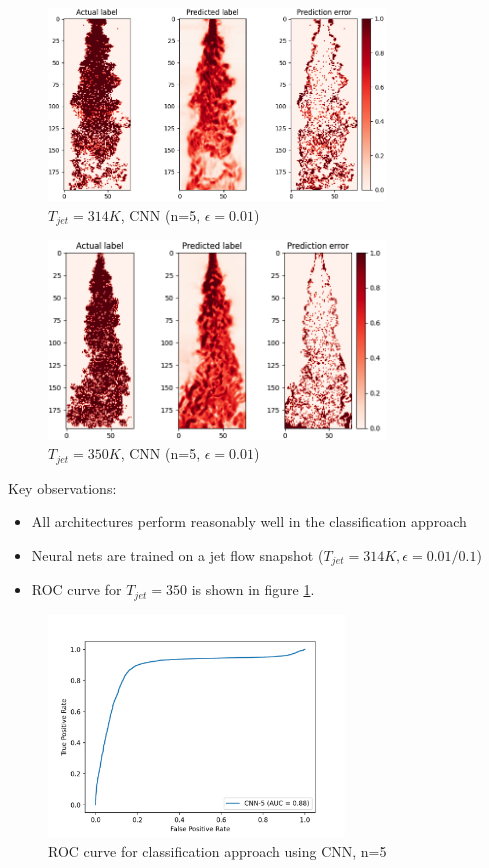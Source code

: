 \documentclass{article}
\begin{document}
 \begin{figure}
    \centering
    \includegraphics[width=0.8\textwidth]{figures/314_label.png}
    \caption{$T_{jet} = 314 K$, CNN (n=5, $\epsilon = 0.01$)}
\end{figure}
\begin{figure}
	\centering
	\includegraphics[width=0.8\textwidth]{figures/350_label.png}
	\caption{$T_{jet} = 350 K$, CNN (n=5, $\epsilon = 0.01$)}
\end{figure}

Key observations:
	\begin{itemize}
		\item All architectures perform reasonably well in the classification approach
		\item Neural nets are trained on a jet flow snapshot  ($T_{jet}=314 K, \epsilon = 0.01/0.1$) 
		\item ROC curve for $T_{jet}=350$ is shown in figure \ref{fig:roc}.
		\end{itemize}
		\begin{figure}
		    \centering
		    \includegraphics[width=0.7\textwidth]{figures/roc.png}
		    \caption{ROC curve for classification approach using CNN, n=5 }
		    \label{fig:roc}
		\end{figure}
		
\end{document}
